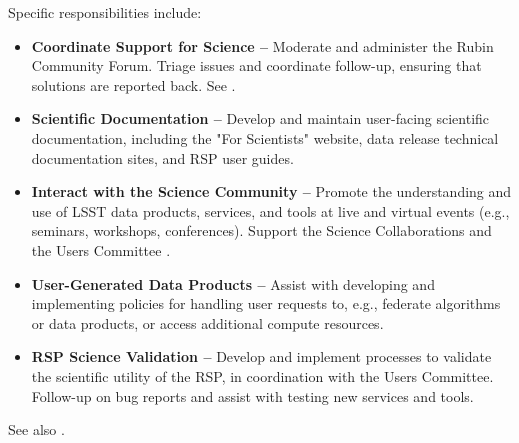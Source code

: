 Specific responsibilities include:

\begin{itemize}
\item \textbf{Coordinate Support for Science --} Moderate and administer the Rubin Community Forum. Triage issues and coordinate follow-up, ensuring that solutions are reported back. See \cite{RTN-097}.
\item \textbf{Scientific Documentation --} Develop and maintain user-facing scientific documentation, including the "For Scientists" website, data release technical documentation sites, and RSP user guides.
\item \textbf{Interact with the Science Community --} Promote the understanding and use of LSST data products, services, and tools at live and virtual events (e.g., seminars, workshops, conferences). Support the Science Collaborations \citep{RTN-118} and the Users Committee \citep{RDO-051}.
\item \textbf{User-Generated Data Products --} Assist with developing and implementing policies for handling user requests to, e.g., federate algorithms or data products, or access additional compute resources.
\item \textbf{RSP Science Validation --} Develop and implement processes to validate the scientific utility of the RSP, in coordination with the Users Committee. Follow-up on bug reports and assist with testing new services and tools.
\end{itemize}

See also .
